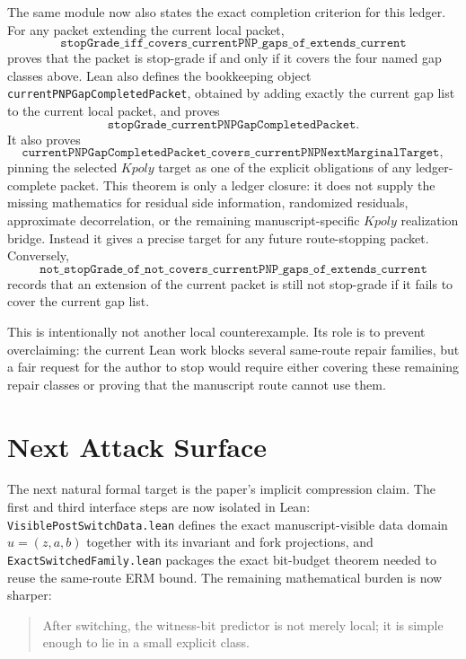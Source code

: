 \documentclass[11pt]{article}
\theoremstyle{remark}
\begin{document}
The same module now also states the exact completion criterion for this ledger.
For any packet extending the current local packet,
\[
  \texttt{stopGrade\_iff\_covers\_currentPNP\_gaps\_of\_extends\_current}
\]
proves that the packet is stop-grade if and only if it covers the four named
gap classes above.  Lean also defines the bookkeeping object
\texttt{currentPNPGapCompletedPacket}, obtained by adding exactly the current
gap list to the current local packet, and proves
\[
  \texttt{stopGrade\_currentPNPGapCompletedPacket}.
\]
It also proves
\[
  \texttt{currentPNPGapCompletedPacket\_covers\_currentPNPNextMarginalTarget},
\]
pinning the selected \(Kpoly\) target as one of the explicit obligations of any
ledger-complete packet.
This theorem is only a ledger closure: it does not supply the missing
mathematics for residual side information, randomized residuals, approximate
decorrelation, or the remaining manuscript-specific \(Kpoly\) realization
bridge.  Instead it gives a precise
target for any future route-stopping packet.
Conversely,
\[
  \texttt{not\_stopGrade\_of\_not\_covers\_currentPNP\_gaps\_of\_extends\_current}
\]
records that an extension of the current packet is still not stop-grade if it
fails to cover the current gap list.

This is intentionally not another local counterexample.  Its role is to prevent
overclaiming: the current Lean work blocks several same-route repair families,
but a fair request for the author to stop would require either covering these
remaining repair classes or proving that the manuscript route cannot use them.

\section{Next Attack Surface}

The next natural formal target is the paper's implicit compression claim.  The
first and third interface steps are now isolated in Lean:
\texttt{VisiblePostSwitchData.lean} defines the exact manuscript-visible
data domain \(u=(z,a,b)\) together with its invariant and fork projections, and
\texttt{ExactSwitchedFamily.lean} packages the exact bit-budget theorem needed
to reuse the same-route ERM bound.  The remaining mathematical burden is now
sharper:

\begin{quote}
After switching, the witness-bit predictor is not merely local; it is simple enough to lie in a
small explicit class.
\end{quote}
\end{document}
